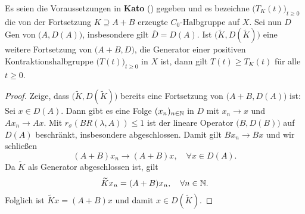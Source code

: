 \begin{prop}\label{Störungstheorem nach Kato, Minimalität der Fortsetzung}
Es seien  die Voraussetzungen in \textbf{Kato} () gegeben und es bezeichne $\big(T_K(t)\big)_{t\geq 0}$ die von der Fortsetzung $K\supseteq A+B$ erzeugte $C_0$-Halbgruppe auf $X$. Sei nun $D$ Gen von $\big(A, D(A)\big)$, insbesondere gilt $\overline{D}=D(A)$. Ist $\big(\widetilde{K}, D(\widetilde{K})\big)$ eine weitere Fortsetzung von $\big(A+B, D\big)$, die Generator einer  positiven Kontraktionshalbgruppe $\big(T(t)\big)_{t\geq0}$ in $X$ ist, dann gilt $T(t)\geq T_K(t)$ für alle $t\geq0$.
\end{prop}

\begin{proof}
\par 
Zeige, dass $\big(\widetilde{K}, D(\widetilde{K})\big)$ bereits eine Fortsetzung von $\big(A+B, D(A)\big)$ ist: Sei  $x\in D(A)$. Dann gibt es eine Folge $(x_n)_{n\in\mathbb{N}}$ in $D$ mit $x_n \to x$ und $Ax_n\to Ax$. Mit $r_\sigma(BR(\lambda, A))\leq 1$ ist der lineare Operator $\big(B, D(B)\big)$ auf $D(A)$ beschränkt, insbesondere abgeschlossen. Damit gilt $Bx_n\to Bx$ und wir schließen
\begin{equation*}
    (A+B)x_n\to (A+B)x,\quad\forall x\in D(A).
\end{equation*}
Da $\widetilde{K}$ als Generator abgeschlossen ist, gilt
\begin{equation*}
\widetilde{K}x_n  = (A+B)x_n,\quad\forall n\in\mathbb{N}.
\end{equation*}
Folglich ist $\widetilde{K}x=(A+B)x$ und damit $x\in D(\widetilde{K})$.


\end{proof}
